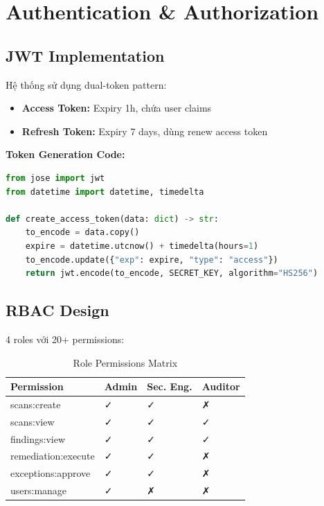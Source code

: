 \documentclass[12pt,a4paper]{report}
\begin{document}
\section{Authentication \& Authorization}

\subsection{JWT Implementation}

Hệ thống sử dụng dual-token pattern:
\begin{itemize}
    \item \textbf{Access Token:} Expiry 1h, chứa user claims
    \item \textbf{Refresh Token:} Expiry 7 days, dùng renew access token
\end{itemize}

\textbf{Token Generation Code:}
\begin{lstlisting}[language=Python]
from jose import jwt
from datetime import datetime, timedelta

def create_access_token(data: dict) -> str:
    to_encode = data.copy()
    expire = datetime.utcnow() + timedelta(hours=1)
    to_encode.update({"exp": expire, "type": "access"})
    return jwt.encode(to_encode, SECRET_KEY, algorithm="HS256")
\end{lstlisting}

\subsection{RBAC Design}

4 roles với 20+ permissions:

\begin{table}[H]
\centering
\caption{Role Permissions Matrix}
\begin{tabular}{llll}
\toprule
\textbf{Permission} & \textbf{Admin} & \textbf{Sec. Eng.} & \textbf{Auditor} \\
\midrule
scans:create & ✓ & ✓ & ✗ \\
scans:view & ✓ & ✓ & ✓ \\
findings:view & ✓ & ✓ & ✓ \\
remediation:execute & ✓ & ✓ & ✗ \\
exceptions:approve & ✓ & ✓ & ✗ \\
users:manage & ✓ & ✗ & ✗ \\
\bottomrule
\end{tabular}
\end{table}
\end{document}

